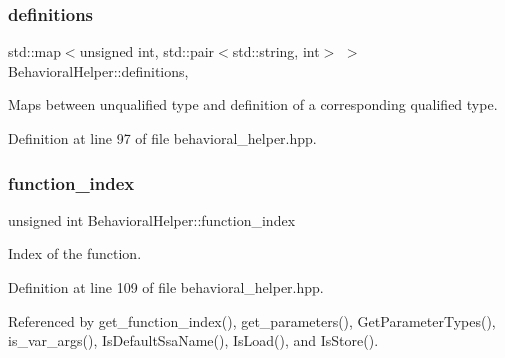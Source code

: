 \mbox{\label{classBehavioralHelper_a9180439a07ab5967f36165831d9b626c}} 
\subsubsection{\texorpdfstring{definitions}{definitions}}
{\footnotesize\ttfamily std\+::map$<$unsigned int, std\+::pair$<$std\+::string, int$>$ $>$ Behavioral\+Helper\+::definitions\hspace{0.3cm}{\ttfamily [static]}, {\ttfamily [protected]}}



Maps between unqualified type and definition of a corresponding qualified type. 



Definition at line 97 of file behavioral\+\_\+helper.\+hpp.

\mbox{\label{classBehavioralHelper_a8af7afb9fea52822de958349b360a224}} 
\subsubsection{\texorpdfstring{function\+\_\+index}{function\_index}}
{\footnotesize\ttfamily unsigned int Behavioral\+Helper\+::function\+\_\+index\hspace{0.3cm}{\ttfamily [protected]}}



Index of the function. 



Definition at line 109 of file behavioral\+\_\+helper.\+hpp.



Referenced by get\+\_\+function\+\_\+index(), get\+\_\+parameters(), Get\+Parameter\+Types(), is\+\_\+var\+\_\+args(), Is\+Default\+Ssa\+Name(), Is\+Load(), and Is\+Store().

\mbox{\label{classBehavioralHelper_a2586d1f88fdf66d62ce3ac6acdd72f12}} 

